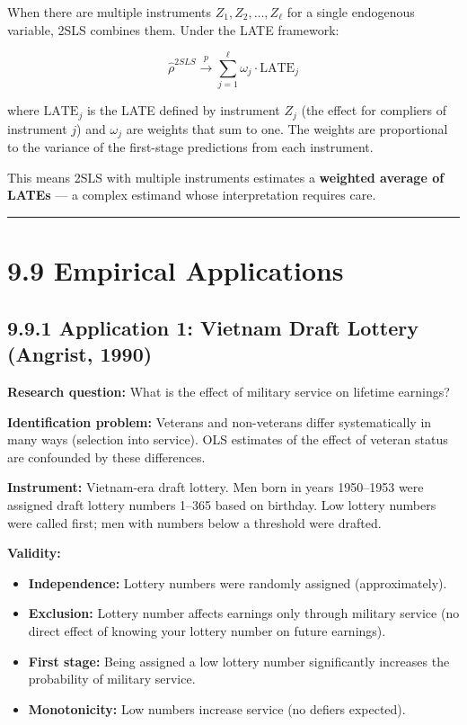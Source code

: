 When there are multiple instruments $Z_1, Z_2, \ldots, Z_\ell$ for a single endogenous variable, 2SLS combines them. Under the LATE framework:

\[
\hat{\rho}^{2SLS} \xrightarrow{p} \sum_{j=1}^\ell \omega_j \cdot \text{LATE}_j
\]

where $\text{LATE}_j$ is the LATE defined by instrument $Z_j$ (the effect for compliers of instrument $j$) and $\omega_j$ are weights that sum to one. The weights are proportional to the variance of the first-stage predictions from each instrument.

This means 2SLS with multiple instruments estimates a \textbf{weighted average of LATEs} --- a complex estimand whose interpretation requires care.

\medskip\hrule\medskip

\section{9.9 Empirical Applications}

\subsection{9.9.1 Application 1: Vietnam Draft Lottery (Angrist, 1990)}

\textbf{Research question:} What is the effect of military service on lifetime earnings?

\textbf{Identification problem:} Veterans and non-veterans differ systematically in many ways (selection into service). OLS estimates of the effect of veteran status are confounded by these differences.

\textbf{Instrument:} Vietnam-era draft lottery. Men born in years 1950--1953 were assigned draft lottery numbers 1--365 based on birthday. Low lottery numbers were called first; men with numbers below a threshold were drafted.

\textbf{Validity:}
\begin{itemize}
\item \textbf{Independence:} Lottery numbers were randomly assigned (approximately).
\item \textbf{Exclusion:} Lottery number affects earnings only through military service (no direct effect of knowing your lottery number on future earnings).
\item \textbf{First stage:} Being assigned a low lottery number significantly increases the probability of military service.
\item \textbf{Monotonicity:} Low numbers increase service (no defiers expected).
\end{itemize}


